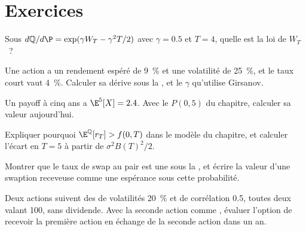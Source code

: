 \section{Exercices}

\begin{exercise}[$\star$]\label{exo:qm:girsanov-and-changes-of-numeraire:1}
Sous $d\mathbb Q/d\P = \exp(\gamma W_T - \gamma^2T/2)$ avec $\gamma = 0.5$ et $T = 4$, quelle est la loi de $W_T$~?
\end{exercise}

\begin{exercise}[$\star$]\label{exo:qm:girsanov-and-changes-of-numeraire:2}
Une action a un rendement espéré de 9~\% et une volatilité de 25~\%, et le taux court vaut 4~\%. Calculer sa dérive sous
la , et le $\gamma$ qu'utilise Girsanov.
\end{exercise}

\begin{exercise}[$\star$]\label{exo:qm:girsanov-and-changes-of-numeraire:3}
Un payoff à cinq ans a $\E^{5}[X] = 2.4$. Avec le $P(0, 5)$ du chapitre, calculer sa valeur aujourd'hui.
\end{exercise}

\begin{exercise}[$\star\star$]\label{exo:qm:girsanov-and-changes-of-numeraire:4}
Expliquer pourquoi $\E^{\mathbb Q}[r_T] > f(0, T)$ dans le modèle du chapitre, et calculer l'écart en $T = 5$ à partir de
$\sigma^2B(T)^2/2$.
\end{exercise}

\begin{exercise}[$\star\star$]\label{exo:qm:girsanov-and-changes-of-numeraire:5}
Montrer que le taux de swap au pair est une  sous la , et écrire la valeur d'une
swaption receveuse comme une espérance sous cette probabilité.
\end{exercise}

\begin{exercise}[$\star\star$]\label{exo:qm:girsanov-and-changes-of-numeraire:6}
Deux actions suivent des  de volatilités 20~\% et de corrélation 0.5, toutes deux valant 100,
sans dividende. Avec la seconde action comme , évaluer l'option de recevoir la première action en échange de
la seconde action dans un an.
\end{exercise}

